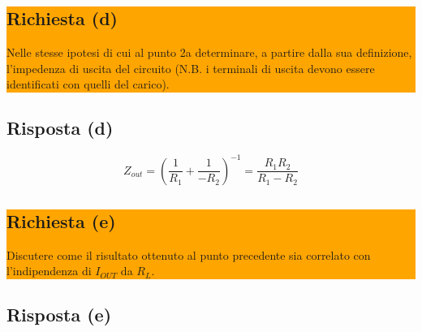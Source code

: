 \noindent\colorbox{orange}{
  \begin{minipage}{1.0\linewidth}
    \subsection*{Richiesta (d)}
    Nelle stesse ipotesi di cui al punto 2a determinare, a partire dalla sua definizione, l'impedenza
    di uscita del circuito (N.B. i terminali di uscita devono essere identificati con quelli del
    carico).
  \end{minipage}
}
\subsection*{Risposta (d)}
\begin{equation*}
  Z_{out} = \left(\frac{1}{R_1} + \frac{1}{-R_2}\right)^{-1} = \frac{R_1R_2}{R_1 - R_2}
\end{equation*}

\noindent\colorbox{orange}{
  \begin{minipage}{1.0\linewidth}
    \subsection*{Richiesta (e)}
    Discutere come il risultato ottenuto al punto precedente sia correlato con l'indipendenza di
    $I_{OUT}$ da $R_L$.
  \end{minipage}
}
\subsection*{Risposta (e)}
